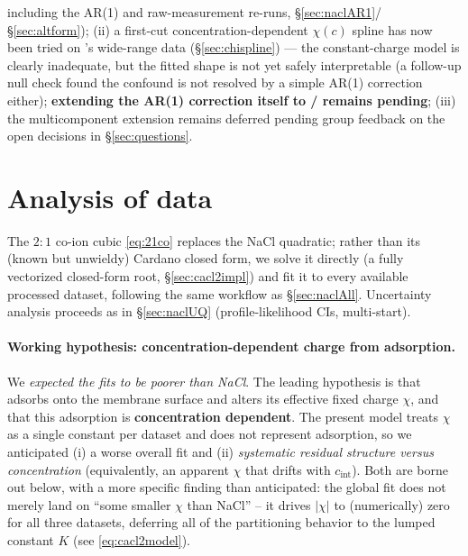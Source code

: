 \documentclass[11pt]{article}
\newcommand{\cint}{c_{\mathrm{int}}}
\begin{document}
\begin{itemize}[itemsep=2pt]
        including the AR(1) and raw-measurement re-runs,
        \S\ref{sec:naclAR1}/\S\ref{sec:altform}); (ii)
        a first-cut concentration-dependent $\chi(c)$ spline has now been
        tried on 's wide-range data (\S\ref{sec:chispline}) --- the
        constant-charge model is clearly inadequate, but the fitted shape is
        not yet safely interpretable (a follow-up null check found the
        confound is not resolved by a simple AR(1) correction either);
        \textbf{extending the AR(1) correction itself to /
        remains pending}; (iii) the multicomponent extension remains deferred
        pending group feedback on the open decisions in
        \S\ref{sec:questions}.
\end{itemize}

\section{Analysis of  data}\label{sec:cacl2}
The $2{:}1$ co-ion cubic \eqref{eq:21co} replaces the NaCl quadratic; rather
than its (known but unwieldy) Cardano closed form, we solve it directly (a
fully vectorized closed-form root, \S\ref{sec:cacl2impl}) and fit it to every
available processed  dataset, following the same workflow as
\S\ref{sec:naclAll}. Uncertainty analysis proceeds as in \S\ref{sec:naclUQ}
(profile-likelihood CIs, multi-start).

\paragraph{Working hypothesis: concentration-dependent charge from 
adsorption.} We \emph{expected the  fits to be poorer than NaCl}. The
leading hypothesis is that  adsorbs onto the membrane surface and
alters its effective fixed charge $\chi$, and that this adsorption is
\textbf{concentration dependent}. The present model treats $\chi$ as a single
constant per dataset and does not represent adsorption, so we anticipated (i) a
worse overall fit and (ii) \emph{systematic residual structure versus
concentration} (equivalently, an apparent $\chi$ that drifts with $\cint$). Both
are borne out below, with a more specific finding than anticipated: the global
fit does not merely land on ``some smaller $\chi$ than NaCl'' -- it drives
$|\chi|$ to (numerically) zero for all three datasets, deferring all of the
partitioning behavior to the lumped constant $K$ (see \eqref{eq:cacl2model}).
\end{document}
